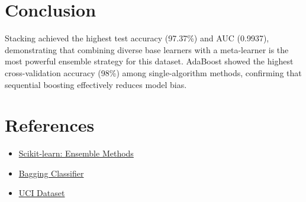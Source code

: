 \documentclass[11pt]{article}
\begin{document}
\section*{Conclusion}
Stacking achieved the highest test accuracy (97.37\%) and AUC (0.9937), demonstrating that combining diverse base learners with a meta-learner is the most powerful ensemble strategy for this dataset. AdaBoost showed the highest cross-validation accuracy (98\%) among single-algorithm methods, confirming that sequential boosting effectively reduces model bias.

\section*{References}
\begin{itemize}
    \item \href{https://scikit-learn.org/stable/modules/ensemble.html}{Scikit-learn: Ensemble Methods}
    \item \href{https://scikit-learn.org/stable/modules/generated/sklearn.ensemble.BaggingClassifier.html}{Bagging Classifier}
    \item \href{https://archive.ics.uci.edu/dataset/17/breast+cancer+wisconsin+diagnostic}{UCI Dataset}
\end{itemize}
\end{document}
